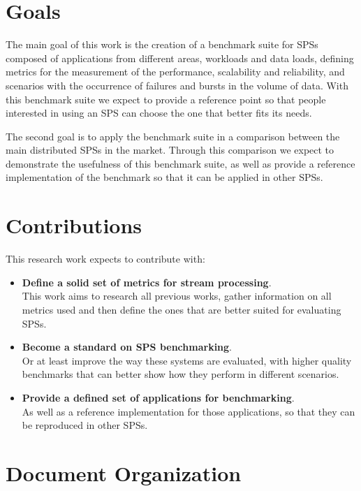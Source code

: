 \documentclass[ppgc,diss,english]{iiufrgs}
\begin{document}
\section{Goals}

The main goal of this work is the creation of a benchmark suite for SPSs composed of applications from different areas, workloads and data loads, defining metrics for the measurement of the performance, scalability and reliability, and scenarios with the occurrence of failures and bursts in the volume of data. With this benchmark suite we expect to provide a reference point so that people interested in using an SPS can choose the one that better fits its needs.

The second goal is to apply the benchmark suite in a comparison between the main distributed SPSs in the market. Through this comparison we expect to demonstrate the usefulness of this benchmark suite, as well as provide a reference implementation of the benchmark so that it can be applied in other SPSs.

\section{Contributions}

This research work expects to contribute with:

\begin{itemize}
\item \textbf{Define a solid set of metrics for stream processing}.\\
	  This work aims to research all previous works, gather information on all metrics used and then define the ones that are better suited for evaluating SPSs.

\item \textbf{Become a standard on SPS benchmarking}.\\
      Or at least improve the way these systems are evaluated, with higher quality benchmarks that can better show how they perform in different scenarios.
      
\item \textbf{Provide a defined set of applications for benchmarking}.\\
      As well as a reference implementation for those applications, so that they can be reproduced in other SPSs.
      

\end{itemize}


\section{Document Organization}
\end{document}
